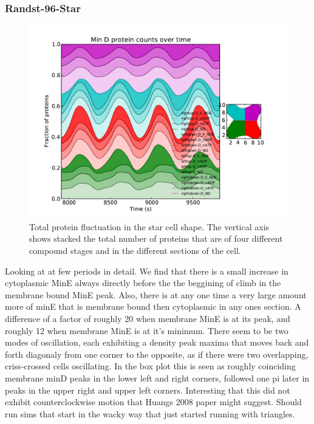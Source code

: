 \documentclass[letterpaper,twocolumn,amsmath,amssymb,pre]{revtex4-1}
\begin{document}
\subsubsection{Randst-96-Star}
\begin{figure}
  \includegraphics[width=\columnwidth]{../data/shape-randst/plots/box-plot_D--randst-25-600-600-9600-1500}
  \caption{Total protein fluctuation in the star cell shape.  The vertical axis shows stacked the total
    number of proteins that are of four different compound stages and
    in the different sections of the cell.}
  \label{total-oscillation-randst-96-plot}
\end{figure}

Looking at at few periods in detail.  We find that there is a small
increase in cytoplasmic MinE always directly before the the beggining
of climb in the membrane bound MinE peak.  Also, there is at any one
time a very large amount more of minE that is membrane bound then
cytoplasmic in any ones section.  A difference of a factor of roughly
20 when membrane MinE is at its peak, and roughly 12 when membrane
MinE is at it's minimum.  There seem to be two modes of oscillation,
each exhibiting a density peak maxima that moves back and forth
diagonaly from one corner to the opposite, as if there were two
overlapping, criss-crossed cells oscillating.  In the box plot this is
seen as roughly coinciding membrane minD peaks in the lower left and
right corners, followed one pi later in peaks in the upper right and
upper left corners.  Interesting that this did not exhibit
counterclockwise motion that Huangs 2008 paper might suggest.  Should
run sims that start in the wacky way that just started running with
triangles.
\newline
\end{document}
